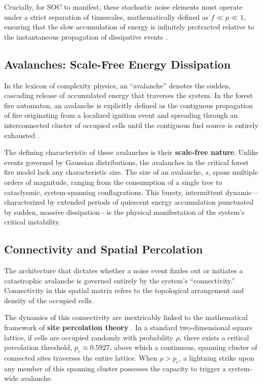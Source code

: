 \documentclass[12pt, a4paper]{article}
\begin{document}
Crucially, for SOC to manifest, these stochastic noise elements must operate under a strict separation of timescales, mathematically defined as $f \ll p \ll 1$, ensuring that the slow accumulation of energy is infinitely protracted relative to the instantaneous propagation of dissipative events \citep{drossel1992}.

\subsection{Avalanches: Scale-Free Energy Dissipation}

In the lexicon of complexity physics, an ``avalanche'' denotes the sudden, cascading release of accumulated energy that traverses the system. In the forest fire automaton, an avalanche is explicitly defined as the contiguous propagation of fire originating from a localized ignition event and spreading through an interconnected cluster of occupied cells until the contiguous fuel source is entirely exhausted \citep{drossel1992}.

The defining characteristic of these avalanches is their \textbf{scale-free nature}. Unlike events governed by Gaussian distributions, the avalanches in the critical forest fire model lack any characteristic size. The size of an avalanche, $s$, spans multiple orders of magnitude, ranging from the consumption of a single tree to cataclysmic, system-spanning conflagrations. This bursty, intermittent dynamic---characterized by extended periods of quiescent energy accumulation punctuated by sudden, massive dissipation---is the physical manifestation of the system's critical instability.

\subsection{Connectivity and Spatial Percolation}

The architecture that dictates whether a noise event fizzles out or initiates a catastrophic avalanche is governed entirely by the system's ``connectivity.'' Connectivity in this spatial matrix refers to the topological arrangement and density of the occupied cells.

The dynamics of this connectivity are inextricably linked to the mathematical framework of \textbf{site percolation theory} \citep{stauffer1994}. In a standard two-dimensional square lattice, if cells are occupied randomly with probability $\rho$, there exists a critical percolation threshold, $p_c \approx 0.5927$, above which a continuous, spanning cluster of connected sites traverses the entire lattice. When $\rho > p_c$, a lightning strike upon any member of this spanning cluster possesses the capacity to trigger a system-wide avalanche.
\end{document}
